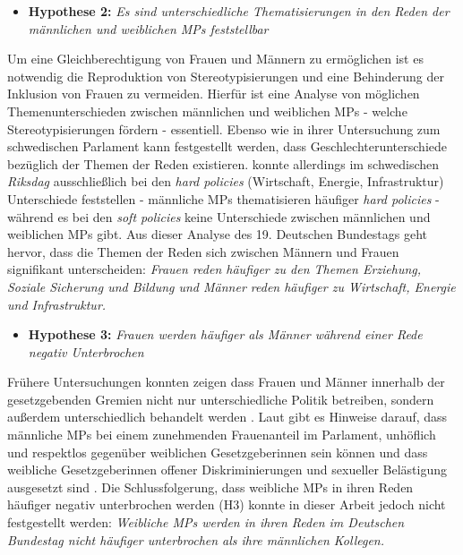 \documentclass[12pt, 
    twoside=false, 
    bibliography=totoc, 
    numbers=endperiod, 
    headings=normal, 
    toc=chapterentrydotfill
    ]{scrbook}
\begin{document}
\begin{itemize}
    \item \textbf{Hypothese 2:} \emph{Es sind unterschiedliche Thematisierungen in den Reden der männlichen und weiblichen MPs feststellbar}
   \end{itemize}
    
Um eine Gleichberechtigung von Frauen und Männern zu ermöglichen ist es notwendig die Reproduktion von Stereotypisierungen und eine Behinderung der Inklusion von Frauen zu vermeiden. Hierfür ist eine Analyse von möglichen Themenunterschieden zwischen männlichen und weiblichen MPs - welche Stereotypisierungen fördern - essentiell. 
Ebenso wie \textcite{back_2014} in ihrer Untersuchung zum schwedischen Parlament kann festgestellt werden, dass Geschlechterunterschiede bezüglich der Themen der Reden existieren. \textcite{back_2014} konnte allerdings im schwedischen \emph{Riksdag} ausschließlich bei den \emph{hard policies} (Wirtschaft, Energie, Infrastruktur) Unterschiede feststellen - männliche MPs thematisieren häufiger \emph{hard policies} -  während es bei den \emph{soft policies} keine Unterschiede zwischen männlichen und weiblichen MPs gibt. Aus dieser Analyse des 19. Deutschen Bundestags geht hervor, dass die Themen der Reden sich zwischen Männern und Frauen signifikant unterscheiden: \emph{Frauen reden häufiger zu den Themen Erziehung, Soziale Sicherung und Bildung und Männer reden häufiger zu Wirtschaft, Energie und Infrastruktur.} 


\begin{itemize}
    \item \textbf{Hypothese 3:} \emph{Frauen werden häufiger als Männer während einer Rede negativ Unterbrochen}
     \end{itemize}

Frühere Untersuchungen konnten zeigen dass Frauen und Männer innerhalb der gesetzgebenden Gremien nicht nur unterschiedliche Politik betreiben, sondern außerdem unterschiedlich behandelt werden \parencites[201]{erikson_2018}{childs_2004}. Laut \textcite{kathlene_1994} gibt es Hinweise darauf, dass männliche MPs bei einem zunehmenden Frauenanteil im Parlament, unhöflich und respektlos gegenüber weiblichen Gesetzgeberinnen sein können \parencites[201]{erikson_2018} und dass weibliche Gesetzgeberinnen offener Diskriminierungen und sexueller Belästigung ausgesetzt sind \parencites[201]{erikson_2018}[76]{lovenduski_2005}{lovenduski_2004}. Die Schlussfolgerung, dass weibliche MPs in ihren Reden häufiger negativ unterbrochen werden (H3) konnte in dieser Arbeit jedoch nicht festgestellt werden: \emph{Weibliche MPs werden in ihren Reden im Deutschen Bundestag nicht häufiger unterbrochen als ihre männlichen Kollegen.} 
\end{document}
